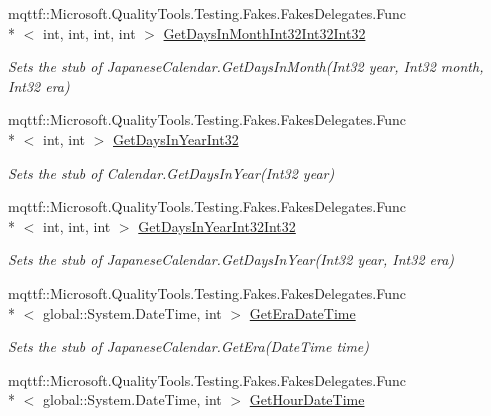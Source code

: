 \begin{DoxyCompactItemize}
mqttf\-::\-Microsoft.\-Quality\-Tools.\-Testing.\-Fakes.\-Fakes\-Delegates.\-Func\\*
$<$ int, int, int, int $>$ \hyperlink{class_system_1_1_globalization_1_1_fakes_1_1_stub_japanese_calendar_accf22352e11a4b6a60444c56f2e51851}{Get\-Days\-In\-Month\-Int32\-Int32\-Int32}
\begin{DoxyCompactList}\small\item\em Sets the stub of Japanese\-Calendar.\-Get\-Days\-In\-Month(\-Int32 year, Int32 month, Int32 era)\end{DoxyCompactList}\item 
mqttf\-::\-Microsoft.\-Quality\-Tools.\-Testing.\-Fakes.\-Fakes\-Delegates.\-Func\\*
$<$ int, int $>$ \hyperlink{class_system_1_1_globalization_1_1_fakes_1_1_stub_japanese_calendar_a8fc2f4f10069b2915933d06e03fe072d}{Get\-Days\-In\-Year\-Int32}
\begin{DoxyCompactList}\small\item\em Sets the stub of Calendar.\-Get\-Days\-In\-Year(\-Int32 year)\end{DoxyCompactList}\item 
mqttf\-::\-Microsoft.\-Quality\-Tools.\-Testing.\-Fakes.\-Fakes\-Delegates.\-Func\\*
$<$ int, int, int $>$ \hyperlink{class_system_1_1_globalization_1_1_fakes_1_1_stub_japanese_calendar_a513ba76d072fa234b0fb6f48c3e42f22}{Get\-Days\-In\-Year\-Int32\-Int32}
\begin{DoxyCompactList}\small\item\em Sets the stub of Japanese\-Calendar.\-Get\-Days\-In\-Year(\-Int32 year, Int32 era)\end{DoxyCompactList}\item 
mqttf\-::\-Microsoft.\-Quality\-Tools.\-Testing.\-Fakes.\-Fakes\-Delegates.\-Func\\*
$<$ global\-::\-System.\-Date\-Time, int $>$ \hyperlink{class_system_1_1_globalization_1_1_fakes_1_1_stub_japanese_calendar_a173a1e13ae5c0eeed8ab717320c1b35b}{Get\-Era\-Date\-Time}
\begin{DoxyCompactList}\small\item\em Sets the stub of Japanese\-Calendar.\-Get\-Era(\-Date\-Time time)\end{DoxyCompactList}\item 
mqttf\-::\-Microsoft.\-Quality\-Tools.\-Testing.\-Fakes.\-Fakes\-Delegates.\-Func\\*
$<$ global\-::\-System.\-Date\-Time, int $>$ \hyperlink{class_system_1_1_globalization_1_1_fakes_1_1_stub_japanese_calendar_a513f8a236c8f2a76b2251312864a4912}{Get\-Hour\-Date\-Time}

\end{DoxyCompactItemize}
